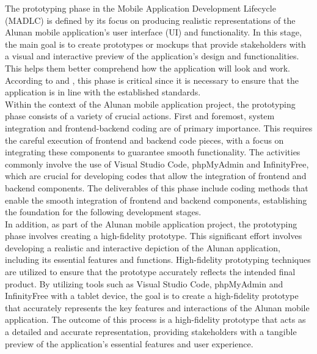 The prototyping phase in the Mobile Application Development Lifecycle (MADLC) is defined by its focus on producing realistic representations of the Alunan mobile application's user interface (UI) and functionality. In this stage, the main goal is to create prototypes or mockups that provide stakeholders with a visual and interactive preview of the application's design and functionalities. This helps them better comprehend how the application will look and work. According to \textcite{shanmugam19} and \textcite{wambua23}, this phase is critical since it is necessary to ensure that the application is in line with the established standards. \\

Within the context of the Alunan mobile application project, the prototyping phase consists of a variety of crucial actions. First and foremost, system integration and frontend-backend coding are of primary importance. This requires the careful execution of frontend and backend code pieces, with a focus on integrating these components to guarantee smooth functionality. The activities commonly involve the use of Visual Studio Code, phpMyAdmin and InfinityFree, which are crucial for developing codes that allow the integration of frontend and backend components. The deliverables of this phase include coding methods that enable the smooth integration of frontend and backend components, establishing the foundation for the following development stages. \\

In addition, as part of the Alunan mobile application project, the prototyping phase involves creating a high-fidelity prototype. This significant effort involves developing a realistic and interactive depiction of the Alunan application, including its essential features and functions. High-fidelity prototyping techniques are utilized to ensure that the prototype accurately reflects the intended final product. By utilizing tools such as Visual Studio Code, phpMyAdmin and InfinityFree with a tablet device, the goal is to create a high-fidelity prototype that accurately represents the key features and interactions of the Alunan mobile application. The outcome of this process is a high-fidelity prototype that acts as a detailed and accurate representation, providing stakeholders with a tangible preview of the application's essential features and user experience.
\pagebreak


